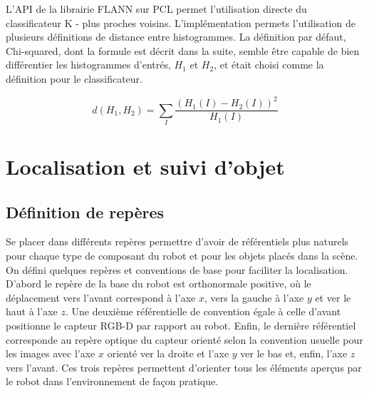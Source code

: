 L'API de la librairie FLANN sur PCL permet l'utilisation directe du classificateur
K - plus proches voisins. L'implémentation permets l'utilisation de plusieurs
définitions de distance entre histogrammes. La définition par défaut, Chi-squared,
dont la formule est décrit dans la suite, semble être capable de bien différentier
les histogrammes d'entrés, $H_1$ et $H_2$, et était choisi comme la définition pour le classificateur.

$$d(H_1, H_2) = \sum _I \frac{\left(H_1(I)-H_2(I)\right)^2}{H_1(I)} $$


\section{Localisation et suivi d'objet}

\subsection{Définition de repères}

Se placer dans différents repères permettre d'avoir de référentiels plus naturels pour chaque type de composant du robot et pour les objets placés dans la scène. On défini quelques repères et conventions de base pour faciliter la localisation. D'abord le repère de la base du robot est orthonormale positive, où le déplacement vers l'avant correspond à l'axe $x$, vers la gauche à l'axe $y$ et ver le haut à l'axe $z$. Une deuxième référentielle de convention égale à celle d'avant positionne le capteur RGB-D par rapport au robot. Enfin, le dernière référentiel corresponde au repère optique du capteur orienté selon la convention usuelle pour les images avec l'axe $x$ orienté ver la droite et l'axe $y$ ver le bas et, enfin, l'axe $z$ vers l'avant. Ces trois repères permettent d'orienter tous les éléments aperçus par le robot dans l'environnement de façon pratique.


